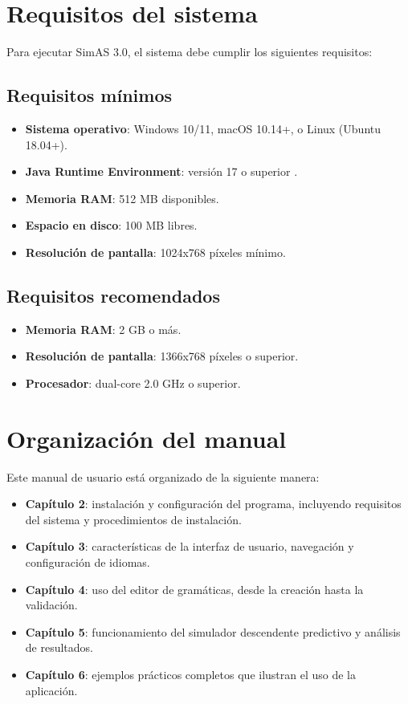 \section{Requisitos del sistema}

Para ejecutar SimAS 3.0, el sistema debe cumplir los siguientes requisitos:

\subsection{Requisitos mínimos}
\begin{itemize}
    \item \textbf{Sistema operativo}: Windows 10/11, macOS 10.14+, o Linux (Ubuntu 18.04+).
    \item \textbf{Java Runtime Environment}: versión 17 o superior \cite{java}.
    \item \textbf{Memoria RAM}: 512 MB disponibles.
    \item \textbf{Espacio en disco}: 100 MB libres.
    \item \textbf{Resolución de pantalla}: 1024x768 píxeles mínimo.
\end{itemize}

\subsection{Requisitos recomendados}
\begin{itemize}
    \item \textbf{Memoria RAM}: 2 GB o más.
    \item \textbf{Resolución de pantalla}: 1366x768 píxeles o superior.
    \item \textbf{Procesador}: dual-core 2.0 GHz o superior.
\end{itemize}

\section{Organización del manual}

Este manual de usuario está organizado de la siguiente manera:

\begin{itemize}
    \item \textbf{Capítulo 2}: instalación y configuración del programa, incluyendo requisitos del sistema y procedimientos de instalación.
    \item \textbf{Capítulo 3}: características de la interfaz de usuario, navegación y configuración de idiomas.
    \item \textbf{Capítulo 4}: uso del editor de gramáticas, desde la creación hasta la validación.
    \item \textbf{Capítulo 5}: funcionamiento del simulador descendente predictivo y análisis de resultados.
    \item \textbf{Capítulo 6}: ejemplos prácticos completos que ilustran el uso de la aplicación.
\end{itemize}

